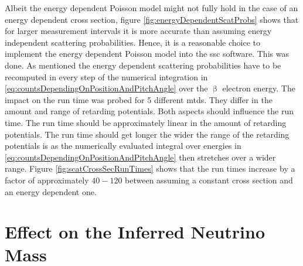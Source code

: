 Albeit the energy dependent Poisson model might not fully hold in the case of an energy dependent cross section, figure \ref{fig:energyDependentScatProbs} shows that for larger measurement intervals it is more accurate than assuming energy independent scattering probabilities. Hence, it is a reasonable choice to implement the energy dependent Poisson model into the \gls{ssc} software. This was done. As mentioned the energy dependent scattering probabilities have to be recomputed in every step of the numerical integration in \eqref{eq:countsDependingOnPositionAndPitchAngle} over the $\upbeta$ electron energy. The impact on the run time was probed for 5 different \gls{mtd}s. They differ in the amount and range of retarding potentials. Both aspects should influence the run time. The run time should be approximately linear in the amount of retarding potentials. The run time should get longer the wider the range of the retarding potentials is as the numerically evaluated integral over energies in \eqref{eq:countsDependingOnPositionAndPitchAngle} then stretches over a wider range. Figure \ref{fig:scatCrossSecRunTimes} shows that the run times increase by a factor of approximately $40-120$ between assuming a constant cross section and an energy dependent one.

\section{Effect on the Inferred Neutrino Mass}
